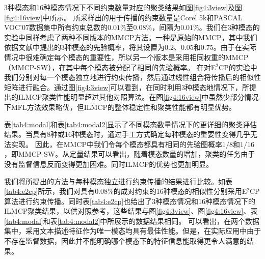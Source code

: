 3种模态和16种模态情况下不同约束数量对应的聚类结果如图\ref{fig4:3view}及图\ref{fig4:16view}中所示。
所采样出的用于传播的约束数量是Corel 5k和PASCAL VOC'07数据集中所有约束总数的$0.01\%$至$0.08\%$，间隔为$0.01\%$。我们在3种模态的实验中同样考虑了两种不同版本的MMCP方法。一种是原始的MMCP，其中我们依据文献\parencite{fu2011multi}中提出的3种模态的先验概率，将其设置为0.2、0.05和0.75。由于在实际情况中很难确定每个模态的重要性，所以另一个版本是采用相同权重的MMCP（MMCP-SW），在其中每个模态被分配了相同的先验概率。
在对E$^2$CP的实验中我们分别对每一个模态独立地进行约束传播，然后通过线性组合将传播后的相似性矩阵进行融合。通过图\ref{fig4:3view}可以看到，在同时利用3种模态地情况下，所提出的ILMCP聚类性能明显超过其他对照算法。在图\ref{fig4:16view}中虽然少部分情况下MFL方法效果略优，但ILMCP的整体稳定性和聚类性能都有明显优势。

表\ref{tab4:modal}和表\ref{tab4:modal2}显示了不同模态数量情况下的更详细的聚类评估结果。当具有8种或16种模态时，通过手工方式确定每种模态的重要性变得几乎无法实现。 因此，在MMCP中我们令每个模态都具有相同的先验图概率$1/8$和$1/16$，即MMCP-SW。从定量结果可以看出，随着模态数量的增加，聚类的任务由于没有监督信息反而变得更加困难。同时ILMCP的优势也更加明显。

我们将所提出的方法与每种模态独立进行约束传播的结果进行比较。如表\ref{tab4:e2cp}所示，我们对具有$0.08\%$的成对约束的16种模态的相似性分别采用E$^2$CP算法进行约束传播。同时表\ref{tab4:e2cp}也给出了3种模态情况和16种模态情况下的ILMCP聚类结果，以供对照参考，这些结果与图\ref{fig4:3view}、图\ref{fig4:16view}、表\ref{tab4:modal}和表\ref{tab4:modal2}中所展示的数据结果相同。
可以看出，在两个数据集中，采用文本描述特征作为唯一模态均具有最佳性能。但是，在实际应用中由于不存在监督数据，因此并不能明确哪个模态下的特征信息能取得更令人满意的结果。

